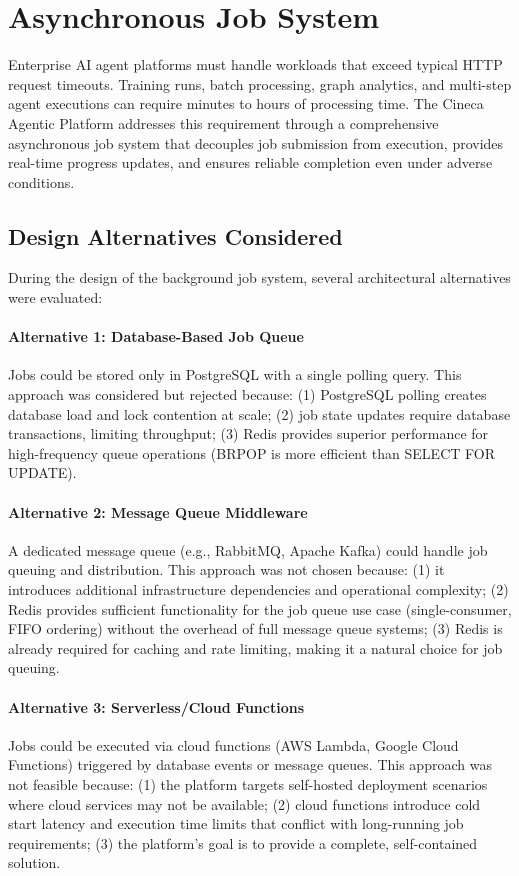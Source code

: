 \documentclass[a4paper,twoside]{sapthesis}
\begin{document}
\section{Asynchronous Job System}
\label{sec:job-system}

Enterprise AI agent platforms must handle workloads that exceed typical HTTP request timeouts. Training runs, batch processing, graph analytics, and multi-step agent executions can require minutes to hours of processing time. The Cineca Agentic Platform addresses this requirement through a comprehensive asynchronous job system that decouples job submission from execution, provides real-time progress updates, and ensures reliable completion even under adverse conditions.

\subsection{Design Alternatives Considered}

During the design of the background job system, several architectural alternatives were evaluated:

\paragraph{Alternative 1: Database-Based Job Queue}
Jobs could be stored only in PostgreSQL with a single polling query. This approach was considered but rejected because: (1) PostgreSQL polling creates database load and lock contention at scale; (2) job state updates require database transactions, limiting throughput; (3) Redis provides superior performance for high-frequency queue operations (BRPOP is more efficient than SELECT FOR UPDATE).

\paragraph{Alternative 2: Message Queue Middleware}
A dedicated message queue (e.g., RabbitMQ, Apache Kafka) could handle job queuing and distribution. This approach was not chosen because: (1) it introduces additional infrastructure dependencies and operational complexity; (2) Redis provides sufficient functionality for the job queue use case (single-consumer, FIFO ordering) without the overhead of full message queue systems; (3) Redis is already required for caching and rate limiting, making it a natural choice for job queuing.

\paragraph{Alternative 3: Serverless/Cloud Functions}
Jobs could be executed via cloud functions (AWS Lambda, Google Cloud Functions) triggered by database events or message queues. This approach was not feasible because: (1) the platform targets self-hosted deployment scenarios where cloud services may not be available; (2) cloud functions introduce cold start latency and execution time limits that conflict with long-running job requirements; (3) the platform's goal is to provide a complete, self-contained solution.
\end{document}

